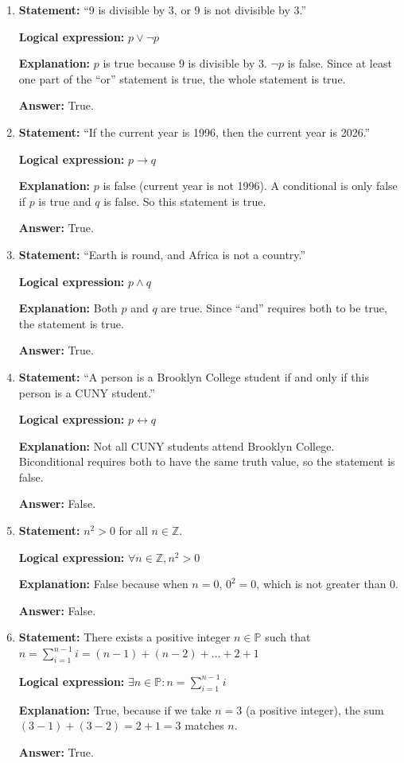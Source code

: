 \documentclass[12pt]{article}
\begin{document}
\begin{enumerate}

\item[ (a) ] \textbf{Statement:} “9 is divisible by 3, or 9 is not divisible by 3.”  

\textbf{Logical expression:} $p \lor \neg p$  

\textbf{Explanation:} $p$ is true because 9 is divisible by 3. $\neg p$ is false. Since at least one part of the “or” statement is true, the whole statement is true.  

\textbf{Answer:} True.

\item[ (b) ] \textbf{Statement:} “If the current year is 1996, then the current year is 2026.”  

\textbf{Logical expression:} $p \rightarrow q$  

\textbf{Explanation:} $p$ is false (current year is not 1996). A conditional is only false if $p$ is true and $q$ is false. So this statement is true.  

\textbf{Answer:} True.

\item[ (c) ] \textbf{Statement:} “Earth is round, and Africa is not a country.” 
 
\textbf{Logical expression:} $p \land q$  

\textbf{Explanation:} Both $p$ and $q$ are true. Since “and” requires both to be true, the statement is true.  

\textbf{Answer:} True.

\item[ (d) ] \textbf{Statement:} “A person is a Brooklyn College student if and only if this person is a CUNY student.”  

\textbf{Logical expression:} $p \leftrightarrow q$  

\textbf{Explanation:} Not all CUNY students attend Brooklyn College. Biconditional requires both to have the same truth value, so the statement is false.  

\textbf{Answer:} False.

\item[ (e) ] \textbf{Statement:} $n^2 > 0$ for all $n \in \mathbb{Z}$.  

\textbf{Logical expression:} $\forall n \in \mathbb{Z}, n^2 > 0$  

\textbf{Explanation:} False because when $n=0$, $0^2=0$, which is not greater than 0.  

\textbf{Answer:} False.

\item[ (f) ] \textbf{Statement:} There exists a positive integer $n \in \mathbb{P}$ such that $n = \sum_{i=1}^{n-1} i = (n-1) + (n-2) + \dots + 2 + 1$  

\textbf{Logical expression:} $\exists n \in \mathbb{P} : n = \sum_{i=1}^{n-1} i$  

\textbf{Explanation:} True, because if we take $n=3$ (a positive integer), the sum $(3-1) + (3-2) = 2 + 1 = 3$ matches $n$.  

\textbf{Answer:} True.

\end{enumerate}
\end{document}

